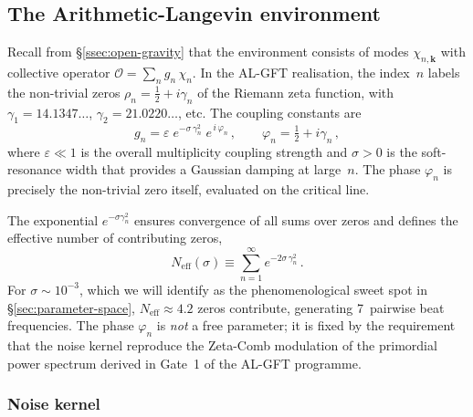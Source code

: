\documentclass[12pt,a4paper]{article}
\begin{document}
\subsection{The Arithmetic-Langevin environment}\label{ssec:zeta-environment}

Recall from \S\ref{ssec:open-gravity} that the environment consists of
modes $\chi_{n,\mathbf{k}}$ with collective operator
$\mathcal{O}=\sum_{n}g_{n}\,\chi_{n}$.  In the AL-GFT realisation, the
index~$n$ labels the non-trivial zeros $\rho_{n}=\tfrac{1}{2}+i\gamma_{n}$
of the Riemann zeta function, with $\gamma_{1}=14.1347\ldots$,
$\gamma_{2}=21.0220\ldots$, etc.  The coupling constants are
\begin{equation}\label{eq:gn}
  \boxed{
  g_{n}
  = \varepsilon\;
    e^{-\sigma\,\gamma_{n}^{2}}\;
    e^{\,i\,\varphi_{n}}\,,
  \qquad
  \varphi_{n}=\tfrac{1}{2}+i\gamma_{n}\,,}
\end{equation}
where $\varepsilon\ll 1$ is the overall multiplicity coupling strength
and $\sigma>0$ is the soft-resonance width that provides a Gaussian
damping at large~$n$.  The phase $\varphi_{n}$ is precisely the
non-trivial zero itself, evaluated on the critical line.

\begin{remark}\label{rem:gn-motivation}
The exponential $e^{-\sigma\gamma_{n}^{2}}$ ensures convergence of
all sums over zeros and defines the effective number of contributing
zeros,
\begin{equation}\label{eq:Neff}
  N_{\mathrm{eff}}(\sigma)
  \equiv \sum_{n=1}^{\infty}e^{-2\sigma\,\gamma_{n}^{2}}\,.
\end{equation}
For $\sigma\sim 10^{-3}$, which we will identify as the
phenomenological sweet spot in \S\ref{sec:parameter-space},
$N_{\mathrm{eff}}\approx 4.2$ zeros contribute, generating 7~pairwise
beat frequencies.  The phase $\varphi_{n}$ is \emph{not} a free
parameter; it is fixed by the requirement that the noise kernel
reproduce the Zeta-Comb modulation of the primordial power spectrum
derived in Gate~1 of the AL-GFT programme.
\end{remark}

\subsubsection{Noise kernel}\label{sssec:noise-kernel}
\end{document}
